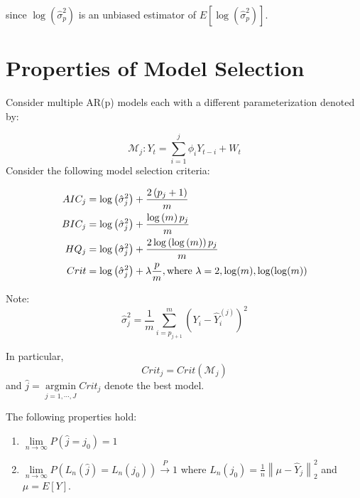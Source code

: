 \documentclass[]{book}
\providecommand{\tightlist}{%
  \setlength{\itemsep}{0pt}\setlength{\parskip}{0pt}}
\theoremstyle{definition}
\theoremstyle{definition}
\theoremstyle{definition}
\theoremstyle{remark}
\begin{document}
{since \(\log \left( {\hat \sigma _p^2} \right)\) is an unbiased
estimator of
\(E\left[ {\log \left( {\hat \sigma _p^2} \right)} \right]\).

\hypertarget{properties-of-model-selection}{%
\section{Properties of Model
Selection}\label{properties-of-model-selection}}

Consider multiple AR(p) models each with a different parameterization
denoted by:

\[\mathcal{M}_j: {Y_t} = \sum\limits_{i = 1}^j {{\phi _i}{Y_{t - i}}}  + {W_t}\]
Consider the following model selection criteria:

\begin{align*}
  AI{C_j} &= \log \left( {\hat \sigma _j^2} \right) + \frac{{2\left( {{p_j} + 1} \right)}}{m} \hfill \\
  BI{C_j} &= \log \left( {\hat \sigma _j^2} \right) + \frac{{\log \left( m \right){p_j}}}{m} \hfill \\
  H{Q_j}  &= \log \left( {\hat \sigma _j^2} \right) + \frac{{2\log \left( {\log \left( m \right)} \right){p_j}}}{m} \hfill \\ 
  Crit    &= \log \left( {\hat \sigma _j^2} \right) + \lambda \frac{p}{m}, \text{where }\lambda=2,\log(m),\log(\log(m))
\end{align*}

Note:
\[\hat \sigma _j^2 = \frac{1}{m}\sum\limits_{i = {p_{j + 1}}}^m {{{\left( {{Y_i} - \hat Y_i^{\left( j \right)}} \right)}^2}} \]

In particular, \[Crit_j = Crit(\mathcal{M}_j)\] and
\(\hat j = \mathop {\arg \min }\limits_{j = 1, \cdots ,J} {Crit_j}\)
denote the best model.

The following properties hold:

\begin{enumerate}
\def\labelenumi{\arabic{enumi}.}
\tightlist
\item
  \(\mathop {\lim }\limits_{n \to \infty } P\left( {\hat j = {j_0}} \right) = 1\)
\item
  \(\mathop {\lim }\limits_{n \to \infty } P\left( {{L_n}\left( {\hat j} \right) = {L_n}\left( {{j_0}} \right)} \right)\mathop \to \limits^P 1\)
  where
  \({L_n}\left( {{j_0}} \right) = \frac{1}{n}\left\| {\mu - {{\hat Y}_j}} \right\|_2^2\)
  and \(\mu = E\left[ Y \right]\).
\end{enumerate}

}
\end{document}
